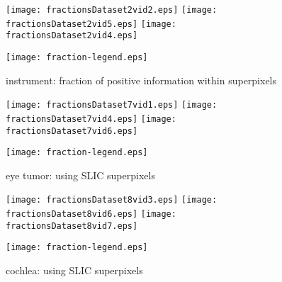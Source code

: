 \begin{figure}[ht]
	  \texttt{[image: fractionsDataset2vid2.eps]}
	  \texttt{[image: fractionsDataset2vid5.eps]}	  
	  \texttt{[image: fractionsDataset2vid4.eps]}
	  
	  \centering
	  \texttt{[image: fraction-legend.eps]}
	  \caption{instrument: fraction of positive information within superpixels }
	\label{fig:positiveFractionD2}
\end{figure}

\begin{figure}[ht]
	  \texttt{[image: fractionsDataset7vid1.eps]}
	  \texttt{[image: fractionsDataset7vid4.eps]}
	  \texttt{[image: fractionsDataset7vid6.eps]}
	  
	  \centering
	  \texttt{[image: fraction-legend.eps]}
	  \caption{eye tumor: using SLIC superpixels}
	\label{fig:positiveFractionD7}
\end{figure}

\begin{figure}[ht]
	  \texttt{[image: fractionsDataset8vid3.eps]}
	  \texttt{[image: fractionsDataset8vid6.eps]}
	  \texttt{[image: fractionsDataset8vid7.eps]}
	  
	  \centering
	  \texttt{[image: fraction-legend.eps]}
	  \caption{cochlea: using SLIC superpixels}
	\label{fig:positiveFractionD8}
\end{figure}

